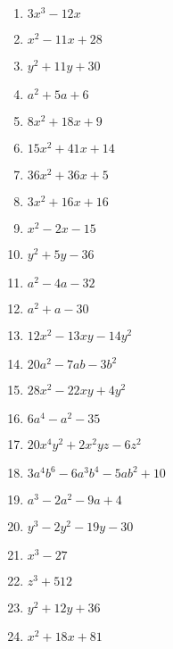 \documentclass[a4paper]{JAC2003}
\begin{document}
\begin{enumerate}
\item $3 x^{3}-12 x$

\item $x^{2}-11 x+28$

\item $y^{2}+11 y+30$

\item $a^{2}+5 a+6$

\item $8 x^{2}+18 x+9$

\item $15 x^{2}+41 x+14$

\item $36 x^{2}+36 x+5$

\item $3 x^{2}+16 x+16$

\item $x^{2}-2 x-15$

\item $y^{2}+5 y-36$

\item $a^{2}-4 a-32$

\item $a^{2}+a-30$

\item $12 x^{2}-13 x y-14 y^{2}$

\item $20 a^{2}-7 a b-3 b^{2}$

\item $28 x^{2}-22 x y+4 y^{2}$

\item $6 a^{4}-a^{2}-35$

\item $20 x^{4} y^{2}+2 x^{2} y z-6 z^{2}$

\item $3 a^{4} b^{6}-6 a^{3} b^{4}-5 a b^{2}+10$

\item $a^{3}-2 a^{2}-9 a+4$

\item $y^{3}-2 y^{2}-19 y-30$

\item $x^{3}-27$

\item $z^{3}+512$

\item $y^{2}+12 y+36$

\item $x^{2}+18 x+81$


\end{enumerate}
\end{document}
